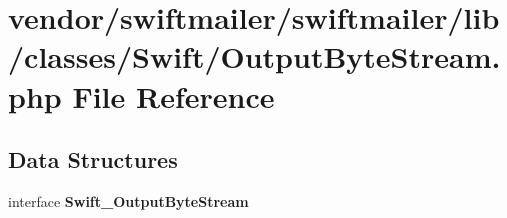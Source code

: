\section{vendor/swiftmailer/swiftmailer/lib/classes/\+Swift/\+Output\+Byte\+Stream.php File Reference}
\label{_output_byte_stream_8php}
\subsection*{Data Structures}
\begin{DoxyCompactItemize}
\item 
interface {\bf Swift\+\_\+\+Output\+Byte\+Stream}
\end{DoxyCompactItemize}
